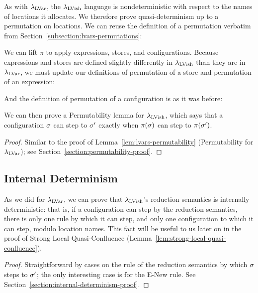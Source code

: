 As with $\lambda_{\textrm{LVar}}$, the $\lambda_{\textrm{LVish}}$ language is nondeterministic with
respect to the names of locations it allocates.  We therefore prove
quasi-determinism up to a permutation on locations.  We can reuse the
definition of a permutation verbatim from
Section~\ref{subsection:lvars-permutations}:

\DefPermutation

We can lift $\pi$ to apply expressions, stores, and
configurations.
\ifdefined\DISSERTATION
Because expressions and stores are defined slightly
differently in $\lambda_{\textrm{LVish}}$ than they are in $\lambda_{\textrm{LVar}}$, we must
update our definitions of permutation of a store and permutation of an
expression:

\DefPermutationExpression

\DefPermutationStore

And the definition of permutation of a configuration is as it was before:

\DefPermutationConfiguration
\fi
We can then prove a Permutability lemma for $\lambda_{\textrm{LVish}}$, which says
that a configuration $\sigma$ can step to $\sigma'$ exactly when
$\pi(\sigma)$ can step to $\pi(\sigma')$.

\LemPermutability
\ifdefined\DISSERTATION
\begin{proof}
  Similar to the proof of Lemma~\ref{lem:lvars-permutability}
  (Permutability for $\lambda_{\textrm{LVar}}$); see
  Section~\ref{section:permutability-proof}.
\end{proof}
\fi

\subsection{Internal Determinism}

As we did for $\lambda_{\textrm{LVar}}$, we can prove that $\lambda_{\textrm{LVish}}$'s
reduction semantics is internally deterministic: that is, if a
configuration can step by the reduction semantics, there is only one
rule by which it can step, and only one configuration to which it can
step, modulo location names.  This fact will be useful to us later on
in the proof of Strong Local Quasi-Confluence
(Lemma~\ref{lem:strong-local-quasi-confluence}).

\LemInternalDeterminism
\ifdefined\DISSERTATION
\begin{proof}
  Straightforward by cases on the rule of the reduction semantics by
  which $\sigma$ steps to $\sigma'$; the only interesting case is for
  the {\sc E-New} rule.  See
  Section~\ref{section:internal-determinism-proof}.
\end{proof}
\fi

